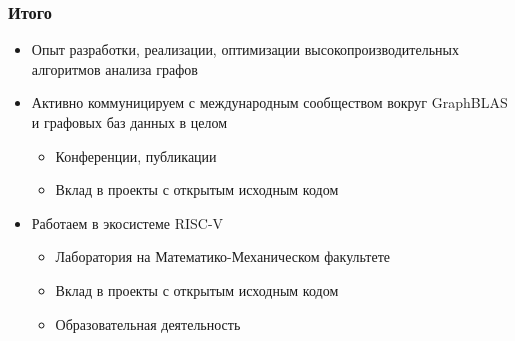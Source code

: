 \documentclass[xcolor=table,aspectratio=169]{beamer}
\begin{document}

\begin{frame}[fragile]
  \frametitle{Итого}
  \begin{itemize}
    \item Опыт разработки, реализации, оптимизации высокопроизводительных алгоритмов анализа графов
    \item Активно коммуницируем с международным сообществом вокруг GraphBLAS и графовых баз данных в целом
    \begin{itemize}
      \item Конференции, публикации
      \item Вклад в проекты с открытым исходным кодом
    \end{itemize}
    \item Работаем в экосистеме RISC-V
    \begin{itemize}
      \item Лаборатория на Математико-Механическом факультете
      \item Вклад в проекты с открытым исходным кодом
      \item Образовательная деятельность
    \end{itemize}
  \end{itemize}
\end{frame}
\end{document}
